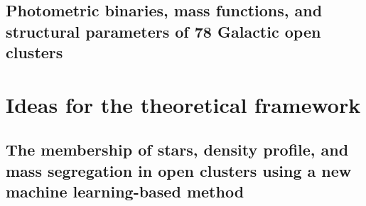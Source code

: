 \documentclass[../main.tex]{subfiles}
\begin{document}
{\subsection{Photometric binaries, mass functions, and structural parameters of 78 Galactic open clusters}


\section{Ideas for the theoretical framework}
\subsection{The membership of stars, density profile, and mass segregation in open clusters using a new machine learning-based method} %

}
\end{document}
